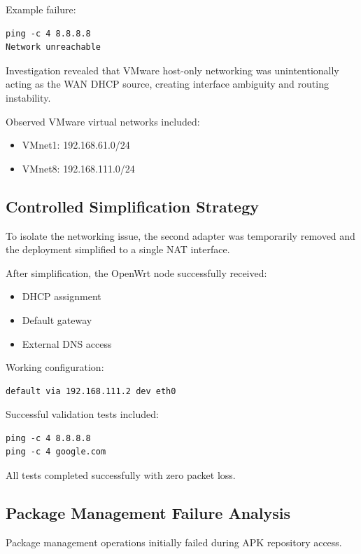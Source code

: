 \documentclass[conference]{IEEEtran}
\begin{document}
Example failure:

\begin{lstlisting}
ping -c 4 8.8.8.8
Network unreachable
\end{lstlisting}

Investigation revealed that VMware host-only networking was unintentionally acting as the WAN DHCP source, creating interface ambiguity and routing instability.

Observed VMware virtual networks included:

\begin{itemize}
    \item VMnet1: 192.168.61.0/24
    \item VMnet8: 192.168.111.0/24
\end{itemize}

\subsection{Controlled Simplification Strategy}

To isolate the networking issue, the second adapter was temporarily removed and the deployment simplified to a single NAT interface.

After simplification, the OpenWrt node successfully received:

\begin{itemize}
    \item DHCP assignment
    \item Default gateway
    \item External DNS access
\end{itemize}

Working configuration:

\begin{lstlisting}
default via 192.168.111.2 dev eth0
\end{lstlisting}

Successful validation tests included:

\begin{lstlisting}
ping -c 4 8.8.8.8
ping -c 4 google.com
\end{lstlisting}

All tests completed successfully with zero packet loss.

\subsection{Package Management Failure Analysis}

Package management operations initially failed during APK repository access.
\end{document}
